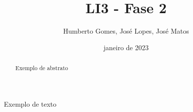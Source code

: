\documentclass[12pt, a4paper]{article}
\title{\textbf{LI3 - Fase 2}}
\author{Humberto Gomes, José Lopes, José Matos}
\date{janeiro de 2023}
\begin{document}
\maketitle
\onehalfspacing
\setlength{\parskip}{\baselineskip}
\setlength{\parindent}{0pt}

\begin{abstract}
	Exemplo de abstrato
\end{abstract}

Exemplo de texto
\end{document}
